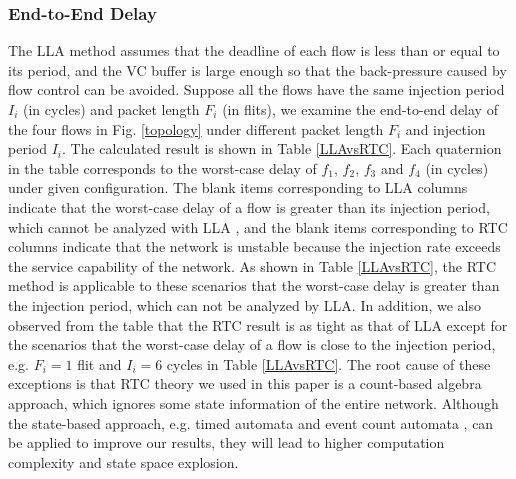 \documentclass[10pt,journal]{IEEEtran}
\begin{document}
\subsubsection{End-to-End Delay}
The LLA method assumes that the deadline of each flow is less than or equal to its period, and the VC buffer is large enough so that the back-pressure caused by flow control can be avoided. Suppose all the flows have the same injection period $I_i$ (in cycles) and packet length $F_i$ (in flits), we examine the end-to-end delay of the four flows in Fig. \ref{topology} under different packet length $F_i$ and injection period $I_i$. The calculated result is shown in Table \ref{LLAvsRTC}. Each quaternion in the table corresponds to the worst-case delay of $f_1$, $f_2$, $f_3$ and $f_4$ (in cycles) under given configuration. The blank items corresponding to LLA columns indicate that the worst-case delay of a flow is greater than its injection period, which cannot be analyzed with LLA \cite{73}\cite{189}, and the blank items corresponding to RTC columns indicate that the network is unstable because the injection rate exceeds the service capability of the network. As shown in Table \ref{LLAvsRTC}, the RTC method is applicable to these scenarios that the worst-case delay is greater than the injection period, which can not be analyzed by LLA. In addition, we also observed from the table that the RTC result is as tight as that of LLA except for the scenarios that the worst-case delay of a flow is close to the injection period, e.g. $F_i=1$ flit and $I_i=6$ cycles in Table \ref{LLAvsRTC}. The root cause of these exceptions is that RTC theory we used in this paper is a count-based algebra approach, which ignores some state information of the entire network. Although the state-based approach, e.g. timed automata \cite{Fersman2006301} and event count automata \cite{Chakraborty:2005:ECA:1106608.1106642}, can be applied to improve our results, they will lead to higher computation complexity and state space explosion.
\end{document}
